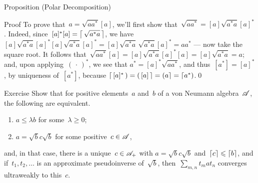 \documentclass[a]{subfiles}
\begin{document}
\begin{parsec}
\begin{point}{Proposition (Polar Decomposition)}
\begin{point}{Proof}
To prove that~$a=\sqrt{aa^*}[a]$,
we'll first show that~$\sqrt{aa^*} = [a] \sqrt{a^*a} [a]^*$.
Indeed, since~$[a]^*[a]=\left\lceil\,\sqrt{a^*a}\,\right\rceil$,
we have
$[a]\sqrt{a^*a}[a]^*[a]\sqrt{a^*a}[a]^*
= [a] \sqrt{a^*a} \,\sqrt{a^*a} [a]^* 
= aa^*$ --- now take the square root.
It follows that~$\sqrt{aa^*}[a]
= [a]\sqrt{a^*a}[a]^*[a]
= [a]\sqrt{a^*a}=a$;
and, upon applying~$(\,\cdot\,)^*$,
we see that
$a^*=[a]^*\sqrt{aa^*}$,
and thus~$[a^*]=[a]^*$,
by uniqueness of~$[a^*]$,
because $\left\lceil\,[a]^*\,\right)=\left(\,[a]\,\right\rceil=  \left(a\right\rceil
=\left\lceil a^*\right)$.\qed
\end{point}
\end{point}
\begin{point}{Exercise}%
Show that for positive elements~$a$ and~$b$ of a von Neumann
algebra~$\mathscr{A}$,
the following are equivalent.
\begin{enumerate}
\item
$a\leq \lambda b$ for some~$\lambda\geq 0$;
\item
$a=\sqrt{b}c\sqrt{b}$
for some positive~$c\in\mathscr{A}$,
\end{enumerate}
and, 
in that case, there is a unique~$c\in\mathscr{A}_+$
with $a=\sqrt{b}c\sqrt{b}$
and~$\left\lceil c\right\rceil\leqslant \left\lceil b\right\rceil$,
and if~$t_1,t_2,\dotsc$
is an approximate pseudoinverse of~$\sqrt{b}$,
then~$\sum_{m,n} t_m a t_n$
converges ultraweakly to this~$c$.
\end{point}
\end{parsec}
\end{document}
